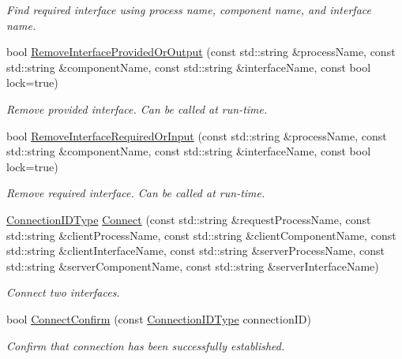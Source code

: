 \begin{DoxyCompactItemize}
\begin{DoxyCompactList}\small\item\em Find required interface using process name, component name, and interface name. \end{DoxyCompactList}\item 
bool \hyperlink{classmts_manager_global_ad997f307343ff4fb5533d2c6ba57596f}{Remove\+Interface\+Provided\+Or\+Output} (const std\+::string \&process\+Name, const std\+::string \&component\+Name, const std\+::string \&interface\+Name, const bool lock=true)
\begin{DoxyCompactList}\small\item\em Remove provided interface. Can be called at run-\/time. \end{DoxyCompactList}\item 
bool \hyperlink{classmts_manager_global_ae6f2ebe45dbea3f0a31b262398fc0907}{Remove\+Interface\+Required\+Or\+Input} (const std\+::string \&process\+Name, const std\+::string \&component\+Name, const std\+::string \&interface\+Name, const bool lock=true)
\begin{DoxyCompactList}\small\item\em Remove required interface. Can be called at run-\/time. \end{DoxyCompactList}\item 
\hyperlink{mts_forward_declarations_8h_ad3543bb11742e1766374ec96016d6547}{Connection\+I\+D\+Type} \hyperlink{classmts_manager_global_a69bc5cdc48aec855dadf46468312d7af}{Connect} (const std\+::string \&request\+Process\+Name, const std\+::string \&client\+Process\+Name, const std\+::string \&client\+Component\+Name, const std\+::string \&client\+Interface\+Name, const std\+::string \&server\+Process\+Name, const std\+::string \&server\+Component\+Name, const std\+::string \&server\+Interface\+Name)
\begin{DoxyCompactList}\small\item\em Connect two interfaces. \end{DoxyCompactList}\item 
bool \hyperlink{classmts_manager_global_a2fdffc2fa545afe88283def2ea1d7c63}{Connect\+Confirm} (const \hyperlink{mts_forward_declarations_8h_ad3543bb11742e1766374ec96016d6547}{Connection\+I\+D\+Type} connection\+I\+D)
\begin{DoxyCompactList}\small\item\em Confirm that connection has been successfully established. \end{DoxyCompactList}\item 

\end{DoxyCompactItemize}
